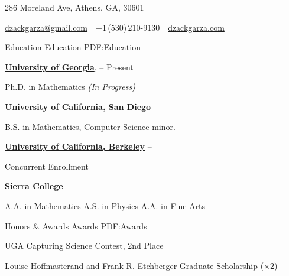 \documentclass[letterpaper,MMMyyyy,nonstopmode]{simpleresumecv}
\newcommand{\CVAuthor}{D. Zack Garza}
\newcommand{\CVWebpage}{dzackgarza.com}
\begin{document}

\Title{\CVAuthor}

\begin{SubTitle}
286 Moreland Ave, Athens, GA, 30601
\par
\href{mailto:dzackgarza@gmail.com}
{dzackgarza@gmail.com}
\,\SubBulletSymbol\,
+1\,(530)\,210-9130
\,\SubBulletSymbol\,
\href{\CVWebpage}
{\url{\CVWebpage}}
\end{SubTitle}

\begin{Body}


\Section
{Education}
{Education}
{PDF:Education}

\Entry
\href{https://www.math.uga.edu/}
{\textbf{University of Georgia}},
\hfill
{} --
Present

\Gap
\BulletItem Ph.D. in Mathematics \textit{(In Progress)}

\BigGap
\Entry
\href{https://www.math.ucsd.edu}
{\textbf{University of California, San Diego}}
\hfill
{} --

\Gap
\BulletItem
B.S. in
\href{https://math.ucsd.edu/programs/undergraduate/}
{Mathematics}, Computer Science minor.

\BigGap
\Entry
\href{https://eecs.berkeley.edu}
{\textbf{University of California, Berkeley}}
\hfill
{} --
\Gap

\BulletItem
Concurrent Enrollment


\BigGap
\Entry
\href{https://www.sierracollege.edu}
{\textbf{Sierra College}}
\hfill
{} --

\Gap
\BulletItem
A.A. in Mathematics
\hfill
\BulletItem
A.S. in Physics
\hfill
\BulletItem
A.A. in Fine Arts


\Section
{Honors \& Awards}
{Awards}
{PDF:Awards}

\BulletItem
UGA Capturing Science Contest, 2nd Place
\hfill{} 

\BulletItem
Louise Hoffmasterand and Frank R. Etchberger Graduate Scholarship ($\times 2$)
\hfill{} -- 


\end{Body}
\end{document}
